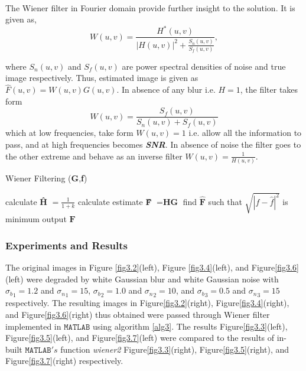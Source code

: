 \documentclass[a4paper]{book}
\begin{document}
\paragraph*{} The Wiener filter in Fourier domain provide further insight to the solution. It is given as,
\begin{equation}
\label{eq3.10}
	W(u,v) = \frac{H^{*}(u,v)}{|H(u,v)|^{2}+\frac{S_{n}(u,v)}{S_{f}(u,v)}},
\end{equation}

where $ S_{n}(u,v) $ and $ S_{f}(u,v) $ are power spectral densities of noise and true image respectively. Thus, estimated image is given as $\hat{F}(u,v) = W(u,v)G(u,v)$. In absence of any blur i.e. $ H = 1 $, the filter takes form 
\begin{equation}
\label{eq3.11}
	W(u,v) = \frac{S_{f}(u,v)}{S_{n}(u,v) + S_{f}(u,v)}
\end{equation}
which at low frequencies, take form $ W(u,v) = 1 $ i.e. allow all the information to pass, and at high frequencies becomes \textbf{\textit{SNR}}. 
In absence of noise the filter goes to the other extreme and behave as an inverse filter $ W(u,v) = \frac{1}{H(u,v)} $.
\bigskip
\begin{algorithm}[]
	\caption{Wiener Filtering (\textbf{G},\textbf{f})}
	\label{alg3}
	\begin{algorithmic}
			\STATE calculate \textbf{\^H} $ =  \frac{1}{1+k} $
			\STATE calculate estimate \textbf{\^F} $ = \textbf{HG} $ 
			\STATE find $ \hat{\textbf{F}} $ such that $ \sqrt{|f - \hat{f}|^{2}} $ is minimum
			\STATE output $\textbf{\^F} $
		\ENDFOR	
	\end{algorithmic}
\end{algorithm}
\newpage
\subsubsection*{Experiments and Results}
 The original images in Figure \ref{fig3.2}(left), Figure \ref{fig3.4}(left), and Figure\ref{fig3.6}(left)  were degraded by white Gaussian blur and white Gaussian noise with $ {\sigma_b}_1 = 1.2 $ and $ {\sigma_n}_1 = 15 $, $ {\sigma_b}_2 = 1.0 $ and $ {\sigma_n}_2 = 10 $, and $ {\sigma_b}_3 = 0.5 $ and $ {\sigma_n}_3 = 15 $ respectively. The resulting images in Figure\ref{fig3.2}(right),  Figure\ref{fig3.4}(right), and  Figure\ref{fig3.6}(right) thus obtained were passed through Wiener filter implemented in $ \mathtt{MATLAB} $ using algorithm \ref{alg3}. 
 The results Figure\ref{fig3.3}(left), Figure\ref{fig3.5}(left), and Figure\ref{fig3.7}(left) were compared to the results of in-built $ \mathtt{MATLAB}'s $ function \textit{wiener2} Figure\ref{fig3.3}(right), Figure\ref{fig3.5}(right), and Figure\ref{fig3.7}(right) respectively.
\end{document}
